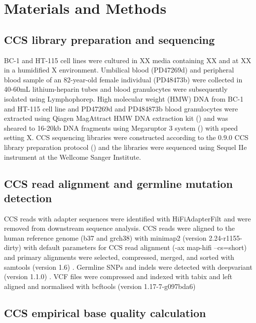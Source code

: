 \section{Materials and Methods}

\subsection{CCS library preparation and sequencing}

BC-1 and HT-115 cell lines were cultured in XX media containing XX and at XX in a humidified X environment. Umbilical blood (PD47269d) and peripheral blood sample of an 82-year-old female individual (PD48473b) were collected in 40-60mL lithium-heparin tubes and blood granulocytes were subsequently isolated using Lymphophorep. High molecular weight (HMW) DNA from BC-1 and HT-115 cell line and PD47269d and PD484873b blood granulocytes were extracted using Qiagen MagAttract HMW DNA extraction kit () and was sheared to 16-20kb DNA fragments using Megaruptor 3 system () with speed setting X. CCS sequencing libraries were constructed according to the 0.9.0 CCS library preparation protocol () and the libraries were sequenced using Sequel IIe instrument at the Wellcome Sanger Institute. 

\subsection{CCS read alignment and germline mutation detection}
CCS reads with adapter sequences were identified with HiFiAdapterFilt \cite{Sim2022-pi} and were removed from downstream sequence analysis. CCS reads were aligned to the human reference genome (b37 and grch38) with minimap2 (version 2.24-r1155-dirty) with default parameters for CCS read alignment (-ax map-hifi --cs=short) \cite{Li2018-am} and primary alignments were selected, compressed, merged, and sorted with samtools (version 1.6) \cite{Li2009-qp}. Germline SNPs and indels were detected with deepvariant (version 1.1.0) \cite{Poplin2018-ub}. VCF files were compressed and indexed with tabix \cite{Li2011-zj} and left aligned and normalised with bcftools (version 1.17-7-g097bda6) \cite{Li2011-ag}

\subsection{CCS empirical base quality calculation}


